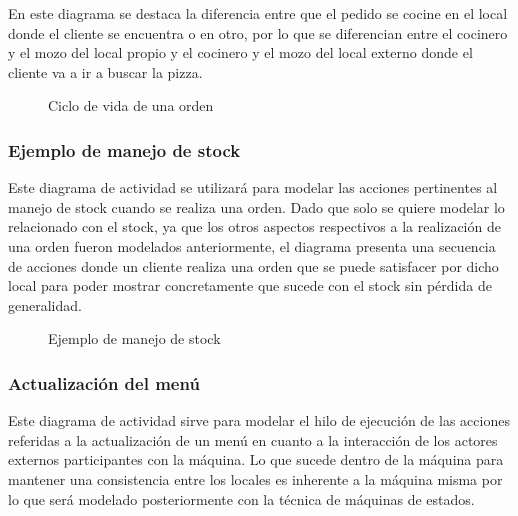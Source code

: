 \documentclass[a4paper,10pt]{article}
\begin{document}
En este diagrama se destaca la diferencia entre que el pedido se cocine en el local donde el cliente se encuentra o en otro, por lo que se 
diferencian entre el cocinero y el mozo del local propio y el cocinero y el mozo del local externo donde el cliente va a ir a buscar la pizza.

\begin{figure}[H]
\centering
{}
\caption{Ciclo de vida de una orden}
\end{figure}

\bigskip

\subsubsection*{Ejemplo de manejo de stock}

Este diagrama de actividad se utilizar\'a para modelar las acciones pertinentes al manejo de stock cuando se realiza una orden. Dado que solo
se quiere modelar lo relacionado con el stock, ya que los otros aspectos respectivos a la realizaci\'on de una orden fueron modelados anteriormente,
el diagrama presenta una secuencia de acciones donde un cliente realiza una orden que se puede satisfacer por dicho local para poder mostrar concretamente
que sucede con el stock sin p\'erdida de generalidad.

\begin{figure}[H]
\centering
{}
\caption{Ejemplo de manejo de stock}
\end{figure}

\bigskip

\subsubsection*{Actualizaci\'on del men\'u}

Este diagrama de actividad sirve para modelar el hilo de ejecuci\'on de las acciones referidas a la actualizaci\'on de un men\'u en cuanto a la interacci\'on
de los actores externos participantes con la m\'aquina. Lo que sucede dentro de la m\'aquina para mantener una consistencia entre los locales es inherente
a la m\'aquina misma por lo que ser\'a modelado posteriormente con la t\'ecnica de m\'aquinas de estados.
\end{document}
